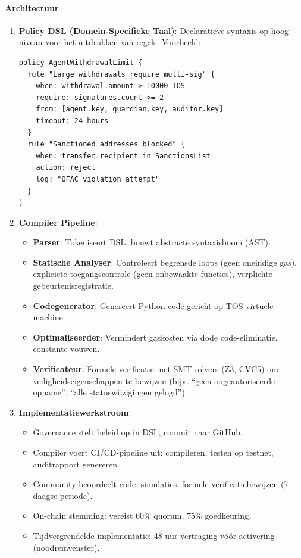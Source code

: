 \documentclass[11pt]{article}
\begin{document}
\paragraph{Architectuur}
\begin{enumerate}[noitemsep]
  \item \textbf{Policy DSL (Domein-Specifieke Taal)}: Declaratieve syntaxis op hoog niveau voor het uitdrukken van regels. Voorbeeld:
  \begin{verbatim}
policy AgentWithdrawalLimit {
  rule "Large withdrawals require multi-sig" {
    when: withdrawal.amount > 10000 TOS
    require: signatures.count >= 2
    from: [agent.key, guardian.key, auditor.key]
    timeout: 24 hours
  }
  rule "Sanctioned addresses blocked" {
    when: transfer.recipient in SanctionsList
    action: reject
    log: "OFAC violation attempt"
  }
}
  \end{verbatim}
  \item \textbf{Compiler Pipeline}:
    \begin{itemize}[noitemsep]
      \item \textbf{Parser}: Tokeniseert DSL, bouwt abstracte syntaxisboom (AST).
      \item \textbf{Statische Analyser}: Controleert begrensde loops (geen oneindige gas), expliciete toegangscontrole (geen onbewaakte functies), verplichte gebeurtenisregistratie.
      \item \textbf{Codegenerator}: Genereert Python-code gericht op TOS virtuele machine.
      \item \textbf{Optimaliseerder}: Vermindert gaskosten via dode code-eliminatie, constante vouwen.
      \item \textbf{Verificateur}: Formele verificatie met SMT-solvers (Z3, CVC5) om veiligheidseigenschappen te bewijzen (bijv. ``geen ongeautoriseerde opname'', ``alle statuswijzigingen gelogd'').
    \end{itemize}
  \item \textbf{Implementatiewerkstroom}:
    \begin{itemize}[noitemsep]
      \item Governance stelt beleid op in DSL, commit naar GitHub.
      \item Compiler voert CI/CD-pipeline uit: compileren, testen op testnet, auditrapport genereren.
      \item Community beoordeelt code, simulaties, formele verificatiebewijzen (7-daagse periode).
      \item On-chain stemming: vereist 60\% quorum, 75\% goedkeuring.
      \item Tijdvergrendelde implementatie: 48-uur vertraging vóór activering (noodremvenster).
    \end{itemize}
\end{enumerate}
\end{document}
